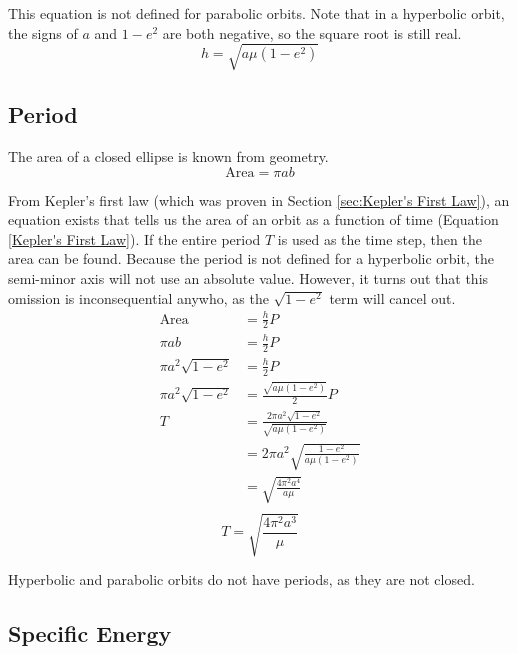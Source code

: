 \documentclass{article}
\begin{document}
This equation is not defined for parabolic orbits. Note that in a hyperbolic orbit, the signs of $a$ and $1-e^2$ are both negative, so the square root is still real.
\begin{equation}\label{Angular Momentum Geometric Definition}
    h=\sqrt{a\mu(1-e^2)}
\end{equation}


\bigskip\bigskip
\subsection{Period}\label{Sec:Period Geometric}

The area of a closed ellipse is known from geometry.
$$\text{Area}=\pi{}ab$$

From Kepler's first law (which was proven in Section \ref{sec:Kepler's First Law}), an equation exists that tells us the area of an orbit as a function of time (Equation \eqref{Kepler's First Law}). If the entire period $T$ is used as the time step, then the area can be found. Because the period is not defined for a hyperbolic orbit, the semi-minor axis will not use an absolute value. However, it turns out that this omission is inconsequential anywho, as the $\sqrt{1-e^2}$ term will cancel out.
\begin{align*}
    \text{Area}          & = \frac{h}{2}P                                     \\
    \pi{}ab              & = \frac{h}{2}P                                     \\
    \pi{}a^2\sqrt{1-e^2} & = \frac{h}{2}P                                     \\
    \pi{}a^2\sqrt{1-e^2} & = \frac{\sqrt{a\mu(1-e^2)}}{2}P                    \\
    T                    & = \frac{2\pi{}a^2\sqrt{1-e^2}}{\sqrt{a\mu(1-e^2)}} \\
                         & = 2\pi{}a^2\sqrt{\frac{1-e^2}{a\mu(1-e^2)}}        \\
                         & = \sqrt{\frac{4\pi^2a^4}{a\mu}}                    \\
\end{align*}
\begin{equation}\label{Period Geometric}
    T = \sqrt{\frac{4\pi^2a^3}{\mu}}
\end{equation}

Hyperbolic and parabolic orbits do not have periods, as they are not closed.

\bigskip\bigskip
\subsection{Specific Energy}\label{sec:Specific Energy}
\end{document}

